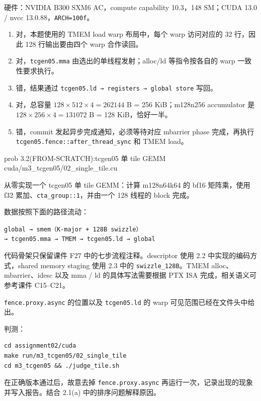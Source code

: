 \documentclass[11pt,a4paper,fontset=fandol]{ctexart}
\begin{document}
\begin{answer}

硬件：NVIDIA B300 SXM6 AC，compute capability 10.3，148 SM；CUDA 13.0 /
nvcc 13.0.88，\texttt{ARCH=\allowbreak{}100f}。

\begin{enumerate}
\def\labelenumi{(\alph{enumi})}
\item
  对，本题使用的 TMEM load warp 布局中，每个 warp 访问对应的 32 行，因此
  128 行输出要由四个 warp 合作读回。
\item
  对，\texttt{tcgen05.\allowbreak{}mma} 由选出的单线程发射；alloc/ld
  等指令按各自的 warp 一致性要求执行。
\item
  错，结果通过
  \texttt{tcgen05.\allowbreak{}ld\ →\ registers\ →\ global\ store}
  写回。
\item
  对，总容量 \(128\times512\times4=262144\) B = 256 KiB；m128n256
  accumulator 是 \(128\times256\times4=131072\) B = 128 KiB，恰好一半。
\item
  错，commit 发起异步完成通知，必须等待对应 mbarrier phase 完成，再执行
  \texttt{tcgen05.\allowbreak{}fence:\allowbreak{}:\allowbreak{}after\_\allowbreak{}thread\_\allowbreak{}sync}
  和 TMEM load。
\end{enumerate}

\end{answer}

\begin{capstone}{prob 3.2(FROM-SCRATCH):tcgen05 单 tile GEMM \hfill {\footnotesize\ttfamily cuda/m3\_tcgen05/02\_single\_tile.cu}}

从零实现一个 tcgen05 单 tile GEMM：计算 m128n64k64 的 bf16 矩阵乘，使用
f32
累加、\texttt{cta\_\allowbreak{}group:\allowbreak{}:\allowbreak{}1}，并由一个
128 线程的 block 完成。

数据按照下面的路径流动：

\texttt{global\ →\ smem（K-\allowbreak{}major\ +\ 128B\ swizzle）→\ tcgen05.\allowbreak{}mma\ →\ TMEM\ →\ tcgen05.\allowbreak{}ld\ →\ global}

代码骨架只保留课件 F27 中的七步流程注释。descriptor 使用 2.2
中实现的编码方式，shared memory staging 使用 2.3 中的
\texttt{swizzle\_\allowbreak{}128B}。TMEM alloc、mbarrier、idesc 以及
mma / ld 的具体写法需要根据 PTX ISA 完成，相关语义可参考课件 C15--C21。

\texttt{fence.\allowbreak{}proxy.\allowbreak{}async} 的位置以及
\texttt{tcgen05.\allowbreak{}ld} 的 warp 可见范围已经在文件头中给出。

判测：

\begin{verbatim}
cd assignment02/cuda
make run/m3_tcgen05/02_single_tile
cd m3_tcgen05 && ./judge_tile.sh
\end{verbatim}

在正确版本通过后，故意去掉
\texttt{fence.\allowbreak{}proxy.\allowbreak{}async}
再运行一次，记录出现的现象并写入报告。结合 2.1(a) 中的排序问题解释原因。

\end{capstone}
\end{document}
